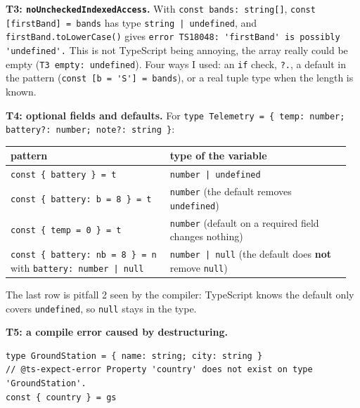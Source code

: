 \textbf{T3: \passthrough{\lstinline!noUncheckedIndexedAccess!}.} With \passthrough{\lstinline!const bands: string[]!}, \passthrough{\lstinline!const [firstBand] = bands!} has type \passthrough{\lstinline!string | undefined!}, and \passthrough{\lstinline!firstBand.toLowerCase()!} gives \passthrough{\lstinline!error TS18048: 'firstBand' is possibly 'undefined'.!} This is not TypeScript being annoying, the array really could be empty (\passthrough{\lstinline!T3 empty: undefined!}). Four ways I used: an \passthrough{\lstinline!if!} check, \passthrough{\lstinline!?.!}, a default in the pattern (\passthrough{\lstinline!const [b = 'S'] = bands!}), or a real tuple type when the length is known.

\textbf{T4: optional fields and defaults.} For \passthrough{\lstinline!type Telemetry = \{ temp: number; battery?: number; note?: string \}!}:

{\small\begin{longtable}[]{@{}>{\raggedright\arraybackslash}p{0.45\linewidth}>{\raggedright\arraybackslash}p{0.51\linewidth}@{}}
\toprule\noalign{}
pattern & type of the variable \\
\midrule\noalign{}
\endhead
\bottomrule\noalign{}
\endlastfoot
\passthrough{\lstinline!const \{ battery \} = t!} & \passthrough{\lstinline!number | undefined!} \\
\passthrough{\lstinline!const \{ battery: b = 8 \} = t!} & \passthrough{\lstinline!number!} (the default removes \passthrough{\lstinline!undefined!}) \\
\passthrough{\lstinline!const \{ temp = 0 \} = t!} & \passthrough{\lstinline!number!} (default on a required field changes nothing) \\
\passthrough{\lstinline!const \{ battery: nb = 8 \} = n!} with \passthrough{\lstinline!battery: number | null!} & \passthrough{\lstinline!number | null!} (the default does \textbf{not} remove \passthrough{\lstinline!null!}) \\
\end{longtable}}

The last row is pitfall 2 seen by the compiler: TypeScript knows the default only covers \passthrough{\lstinline!undefined!}, so \passthrough{\lstinline!null!} stays in the type.

\textbf{T5: a compile error caused by destructuring.}

\begin{lstlisting}
type GroundStation = { name: string; city: string }
// @ts-expect-error Property 'country' does not exist on type 'GroundStation'.
const { country } = gs
\end{lstlisting}

